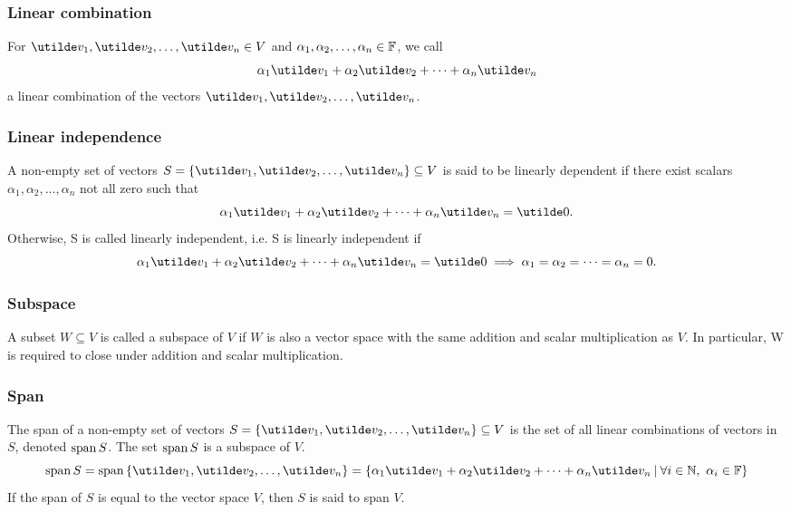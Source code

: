 \documentclass{report}
\begin{document}
\subsubsection*{Linear combination}
For $\ut{v_1}, \ut{v_2}, \dots, \ut{v_n} \in V$ and $\alpha_1, \alpha_2, \dots, \alpha_n \in \mathbb{F}$, we call 
$$
  \alpha_1\ut{v_1} + \alpha_2\ut{v_2} + \dots + \alpha_n\ut{v_n}
$$
a linear combination of the vectors $\ut{v_1}, \ut{v_2}, \dots, \ut{v_n}$.

\subsubsection*{Linear independence}
A non-empty set of vectors $S = \braces{\ut{v_1}, \ut{v_2}, \dots, \ut{v_n}} \subseteq V$ is said to be linearly dependent if there exist scalars $\alpha_1, \alpha_2, \dots, \alpha_n$ not all zero such that
$$
  \alpha_1\ut{v_1} + \alpha_2\ut{v_2} + \dots + \alpha_n\ut{v_n} = \ut{0}.
$$
Otherwise, S is called linearly independent, i.e. S is linearly independent if
$$
  \alpha_1\ut{v_1} + \alpha_2\ut{v_2} + \dots + \alpha_n\ut{v_n} = \ut{0} \implies \alpha_1 = \alpha_2 = \dots = \alpha_n = 0.
$$

\subsubsection*{Subspace}
A subset $W \subseteq V$ is called a subspace of $V$ if $W$ is also a vector space with the same addition and scalar multiplication as $V$. In particular, W is required to close under addition and scalar multiplication.

\subsubsection*{Span}
The span of a non-empty set of vectors $S = \braces{\ut{v_1}, \ut{v_2}, \dots, \ut{v_n}} \subseteq V$ is the set of all linear combinations of vectors in $S$, denoted $\operatorname{span} S$. The set $\operatorname{span} S$ is a subspace of $V$.
$$
  \Span S = \Span\braces{\ut{v_1}, \ut{v_2},\dots,\ut{v_n}} = \braces{\alpha_1\ut{v_1} + \alpha_2\ut{v_2} + \dots + \alpha_n\ut{v_n} \suchthat \forall i\in\bbn,\ \alpha_i\in\bbf}
$$
If the span of $S$ is equal to the vector space $V$, then $S$ is said to span $V$.
\end{document}
